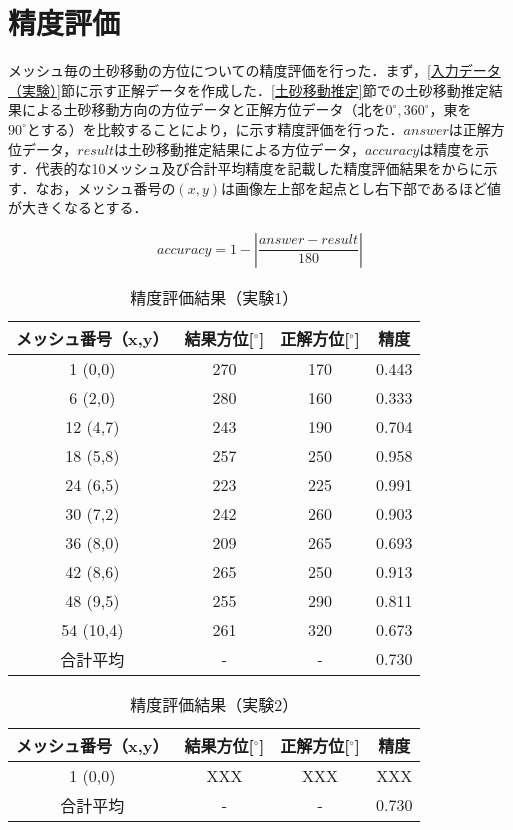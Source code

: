   \section{精度評価}
    メッシュ毎の土砂移動の方位についての精度評価を行った．まず，\ref{入力データ（実験）}節に示す正解データを作成した．\ref{土砂移動推定}節での土砂移動推定結果による土砂移動方向の方位データと正解方位データ（北を$0^{\circ},360^{\circ}$，東を$90^{\circ}とする$）を比較することにより，に示す精度評価を行った．$answer$は正解方位データ，$result$は土砂移動推定結果による方位データ，$accuracy$は精度を示す．代表的な10メッシュ及び合計平均精度を記載した精度評価結果をからに示す．なお，メッシュ番号の$(x,y)$は画像左上部を起点とし右下部であるほど値が大きくなるとする．

    \begin{equation}
      \label{精度評価}
      accuracy = 1 - |\dfrac{answer - result} {180}|
    \end{equation}

    \begin{table}[b]
      \centering
      \caption{精度評価結果（実験1）}
      \label{精度評価結果（実験1）}
      \begin{tabular}{cccc}
        \hline
        \textbf{メッシュ番号（x,y）} & \textbf{結果方位[$^{\circ}$]} & \textbf{正解方位[$^{\circ}$]} & \textbf{精度} \\
        \hline  \hline
        1  (0,0)  & 270 & 170 & 0.443 \\
        6  (2,0)  & 280 & 160 & 0.333 \\
        12 (4,7)  & 243 & 190 & 0.704 \\
        18 (5,8)  & 257 & 250 & 0.958 \\
        24 (6,5)  & 223 & 225 & 0.991 \\
        30 (7,2)  & 242 & 260 & 0.903 \\
        36 (8,0)  & 209 & 265 & 0.693 \\
        42 (8,6)  & 265 & 250 & 0.913 \\
        48 (9,5)  & 255 & 290 & 0.811 \\
        54 (10,4) & 261 & 320 & 0.673 \\
        合計平均 & - & - & 0.730 \\
        \hline
      \end{tabular}
    \end{table}

    \begin{table}[b]
      \centering
      \caption{精度評価結果（実験2）}
      \begin{tabular}{cccc}
        \hline
        \textbf{メッシュ番号（x,y）} & \textbf{結果方位[$^{\circ}$]} & \textbf{正解方位[$^{\circ}$]} & \textbf{精度} \\
        \hline  \hline
        1  (0,0)  & XXX & XXX & XXX \\
        合計平均 & - & - & 0.730 \\
        \hline
      \end{tabular}
    \end{table}

